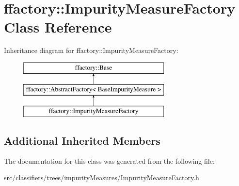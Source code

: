 \hypertarget{classffactory_1_1_impurity_measure_factory}{\section{ffactory\-:\-:Impurity\-Measure\-Factory Class Reference}
\label{classffactory_1_1_impurity_measure_factory}
}
Inheritance diagram for ffactory\-:\-:Impurity\-Measure\-Factory\-:\begin{figure}[H]
\begin{center}
\leavevmode
\includegraphics[height=3.000000cm]{classffactory_1_1_impurity_measure_factory}
\end{center}
\end{figure}
\subsection*{Additional Inherited Members}


The documentation for this class was generated from the following file\-:\begin{DoxyCompactItemize}
\item 
src/classifiers/trees/impurity\-Measures/Impurity\-Measure\-Factory.\-h\end{DoxyCompactItemize}
